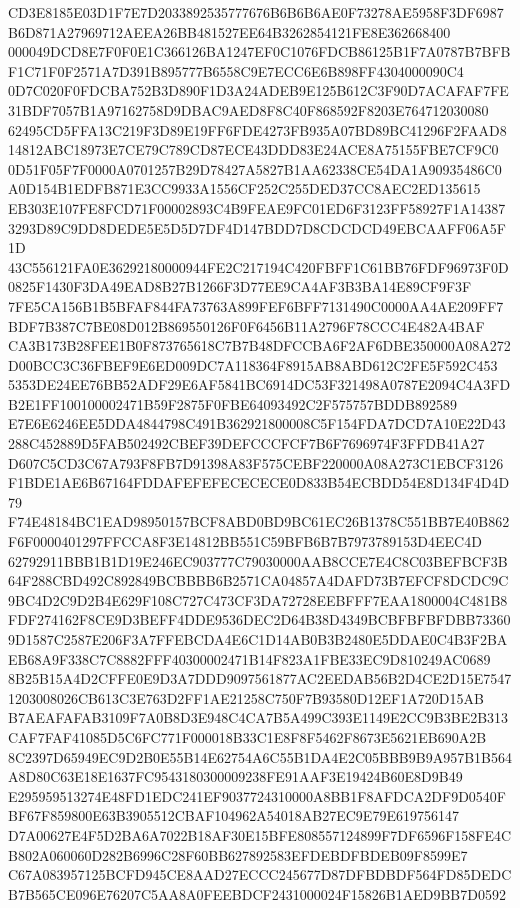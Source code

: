 \documentclass[UTF8,fontset=fandol,zihao=-4,a4paper]{ctexart}
\begin{document}
{{CD3E8185E03D1F7E7D2033892535777676B6B6B6AE0F73278AE5958F3DF6987B6D871A27969712AEEA26BB481527EE64B3262854121FE8E362668400
000049DCD8E7F0F0E1C366126BA1247EF0C1076FDCB86125B1F7A0787B7BFBF1C71F0F2571A7D391B895777B6558C9E7ECC6E6B898FF4304000090C4
0D7C020F0FDCBA752B3D890F1D3A24ADEB9E125B612C3F90D7ACAFAF7FE31BDF7057B1A97162758D9DBAC9AED8F8C40F868592F8203E764712030080
62495CD5FFA13C219F3D89E19FF6FDE4273FB935A07BD89BC41296F2FAAD814812ABC18973E7CE79C789CD87ECE43DDD83E24ACE8A75155FBE7CF9C0
0D51F05F7F0000A0701257B29D78427A5827B1AA62338CE54DA1A90935486C0A0D154B1EDFB871E3CC9933A1556CF252C255DED37CC8AEC2ED135615
EB303E107FE8FCD71F00002893C4B9FEAE9FC01ED6F3123FF58927F1A143873293D89C9DD8DEDE5E5D5D7DF4D147BDD7D8CDCDCD49EBCAAFF06A5F1D
43C556121FA0E36292180000944FE2C217194C420FBFF1C61BB76FDF96973F0D0825F1430F3DA49EAD8B27B1266F3D77EE9CA4AF3B3BA14E89CF9F3F
7FE5CA156B1B5BFAF844FA73763A899FEF6BFF7131490C0000AA4AE209FF7BDF7B387C7BE08D012B869550126F0F6456B11A2796F78CCC4E482A4BAF
CA3B173B28FEE1B0F873765618C7B7B48DFCCBA6F2AF6DBE350000A08A272D00BCC3C36FBEF9E6ED009DC7A118364F8915AB8ABD612C2FE5F592C453
5353DE24EE76BB52ADF29E6AF5841BC6914DC53F321498A0787E2094C4A3FDB2E1FF100100002471B59F2875F0FBE64093492C2F575757BDDB892589
E7E6E6246EE5DDA4844798C491B362921800008C5F154FDA7DCD7A10E22D43288C452889D5FAB502492CBEF39DEFCCCFCF7B6F7696974F3FFDB41A27
D607C5CD3C67A793F8FB7D91398A83F575CEBF220000A08A273C1EBCF3126F1BDE1AE6B67164FDDAFEFEFECECECE0D833B54ECBDD54E8D134F4D4D79
F74E48184BC1EAD98950157BCF8ABD0BD9BC61EC26B1378C551BB7E40B862F6F0000401297FFCCA8F3E14812BB551C59BFB6B7B7973789153D4EEC4D
62792911BBB1B1D19E246EC903777C79030000AAB8CCE7E4C8C03BEFBCF3B64F288CBD492C892849BCBBBB6B2571CA04857A4DAFD73B7EFCF8DCDC9C
9BC4D2C9D2B4E629F108C727C473CF3DA72728EEBFFF7EAA1800004C481B8FDF274162F8CE9D3BEFF4DDE9536DEC2D64B38D4349BCBFBFBFDBB73360
9D1587C2587E206F3A7FFEBCDA4E6C1D14AB0B3B2480E5DDAE0C4B3F2BAEB68A9F338C7C8882FFF40300002471B14F823A1FBE33EC9D810249AC0689
8B25B15A4D2CFFE0E9D3A7DDD9097561877AC2EEDAB56B2D4CE2D15E75471203008026CB613C3E763D2FF1AE21258C750F7B93580D12EF1A720D15AB
B7AEAFAFAB3109F7A0B8D3E948C4CA7B5A499C393E1149E2CC9B3BE2B313CAF7FAF41085D5C6FC771F000018B33C1E8F8F5462F8673E5621EB690A2B
8C2397D65949EC9D2B0E55B14E62754A6C55B1DA4E2C05BBB9B9A957B1B564A8D80C63E18E1637FC9543180300009238FE91AAF3E19424B60E8D9B49
E295959513274E48FD1EDC241EF9037724310000A8BB1F8AFDCA2DF9D0540FBF67F859800E63B3905512CBAF104962A54018AB27EC9E79E619756147
D7A00627E4F5D2BA6A7022B18AF30E15BFE808557124899F7DF6596F158FE4CB802A060060D282B6996C28F60BB627892583EFDEBDFBDEB09F8599E7
C67A083957125BCFD945CE8AAD27ECCC245677D87DFBDBDF564FD85DEDCB7B565CE096E76207C5AA8A0FEEBDCF2431000024F15826B1AED9BB7D0592
}}
\end{document}
